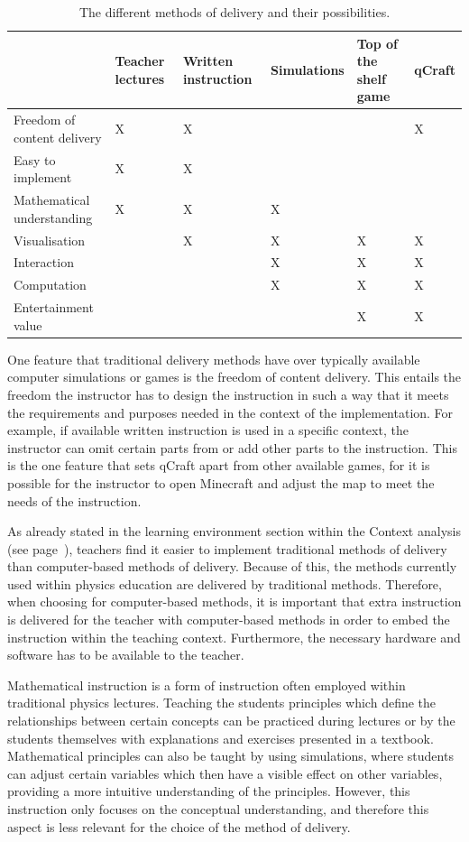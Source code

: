 \documentclass[11pt,twoside]{report} %
\begin{document}
\begin{table}[htbp]
\centering
\begin{tabular}{|p{3cm}|p{2cm}|p{2cm}|p{2cm}|p{2cm}|p{2cm}|}
\hline
 & Teacher lectures & Written instruction & Simulations & Top of the shelf game & qCraft \\ \hline
Freedom of content delivery & X & X &  &  & X \\ \hline
Easy to implement & X & X & & & \\ \hline
Mathematical understanding & X & X & X &  &  \\ \hline
Visualisation &  & X & X & X & X \\ \hline
Interaction &  &  & X & X & X \\ \hline
Computation &  &  & X & X & X \\ \hline
Entertainment value & & & & X & X \\ \hline
\end{tabular}
\caption{The different methods of delivery and their possibilities.\label{tab:comparisonsmedia}}
\end{table}

One feature that traditional delivery methods have over typically available computer simulations or games is the freedom of content delivery. This entails the freedom the instructor has to design the instruction in such a way that it meets the requirements and purposes needed in the context of the implementation. For example, if available written instruction is used in a specific context, the instructor can omit certain parts from or add other parts to the instruction. This is the one feature that sets qCraft apart from other available games, for it is possible for the instructor to open Minecraft and adjust the map to meet the needs of the instruction.

As already stated in the learning environment section within the Context analysis (see page~\pageref{sec:learningenvironment}), teachers find it easier to implement traditional methods of delivery than computer-based methods of delivery. Because of this, the methods currently used within physics education are delivered by traditional methods. Therefore, when choosing for computer-based methods, it is important that extra instruction is delivered for the teacher with computer-based methods in order to embed the instruction within the teaching context. Furthermore, the necessary hardware and software has to be available to the teacher.

Mathematical instruction is a form of instruction often employed within traditional physics lectures. Teaching the students principles which define the relationships between certain concepts can be practiced during lectures or by the students themselves with explanations and exercises presented in a textbook. Mathematical principles can also be taught by using simulations, where students can adjust certain variables which then have a visible effect on other variables, providing a more intuitive understanding of the principles. However, this instruction only focuses on the conceptual understanding, and therefore this aspect is less relevant for the choice of the method of delivery.
\end{document}
